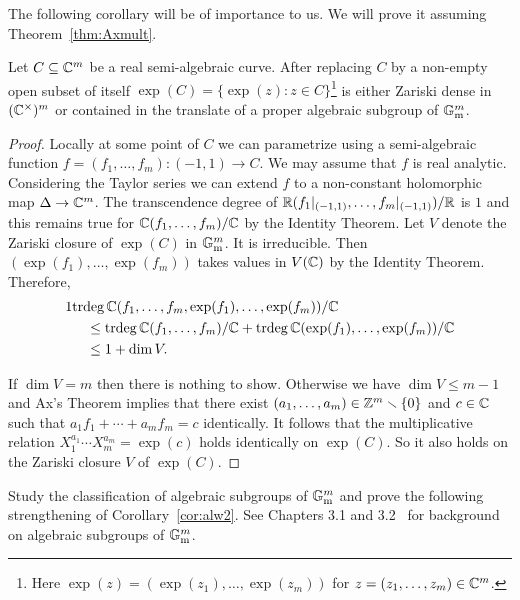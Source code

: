 The following corollary will be of importance to us. We will prove it
assuming Theorem~\ref{thm:Axmult}. 

\begin{corollary}
  \label{cor:alw}
  Let $C\subseteq{\mathbb{C}}^m$ be a real semi-algebraic curve.
  After replacing $C$ by a non-empty open subset of itself
 $\exp(C)=\{\exp(z) :z\in
  C\}$\footnote{Here $\exp(z) = (\exp(z_1),\ldots,\exp(z_m))$ for
    $z=(z_1,\ldots,z_m)\in{\mathbb{C}}^m$.} is either Zariski dense in
  $({\mathbb{C}}^\times)^m$ or contained in
  the
  translate of a proper algebraic subgroup of ${\mathbb{G}}_{\mathrm{m}}^m$.   
\end{corollary}
\begin{proof}  
  Locally at some point of $C$ we can parametrize using a
  semi-algebraic function $f=(f_1,\ldots,f_m)\colon (-1,1)\rightarrow C$. We may assume
  that $f$ is real
  analytic. Considering the Taylor series we can extend $f$ to a
  non-constant  holomorphic map $\Delta\rightarrow{\mathbb{C}}^m$. The
  transcendence degree of
  ${\mathbb{R}}({f_1}|_{(-1,1)},\ldots,{f_m}|_{(-1,1)})/{\mathbb{R}}$ is $1$ and this
  remains true for ${\mathbb{C}}(f_1,\ldots,f_m)/{\mathbb{C}}$ by the Identity Theorem.
  Let $V$ denote the Zariski closure of $\exp(C)$ in
  ${\mathbb{G}}_{\mathrm{m}}^m$. It is irreducible. 
  Then $(\exp(f_1),\ldots,\exp(f_m))$ takes values in $V({\mathbb{C}})$ by
  the Identity Theorem.
  Therefore,
  \begin{alignat*}1
    &\mathrm{trdeg}\,\IC(f_1,\ldots,f_m,\exp(f_1),\ldots,\exp(f_m))/\IC
    \\
    &\quad \le
    \mathrm{trdeg}\,\IC(f_1,\ldots,f_m)/\IC+\mathrm{trdeg}\,\IC(\exp(f_1),\ldots,\exp(f_m))/\IC\\
    &\quad \le
    1+\dim V.
  \end{alignat*}

  If $\dim V=m$ then there is nothing to show. Otherwise we have $\dim
  V \le m-1$ and 
  Ax's Theorem implies that there exist
  $(a_1,\ldots,a_m)\in{\mathbb{Z}}^m\smallsetminus\{0\}$ and $c\in{\mathbb{C}}$ such that
  $a_1f_1+\cdots+a_mf_m=c$ identically. It follows that the
  multiplicative relation
  $X_1^{a_1}\cdots X_m^{a_m} = \exp(c)$ holds identically on
  $\exp(C)$. So it also holds on the Zariski closure $V$ of $\exp(C)$. 
\end{proof}

\begin{exercise}
  Study the classification of algebraic subgroups of ${\mathbb{G}}_{\mathrm{m}}^m$
  and prove the following strengthening of Corollary~\ref{cor:alw2}.
  See Chapters 3.1 and 3.2~\cite{BG} for background on algebraic
  subgroups of ${\mathbb{G}}_{\mathrm{m}}^m$. 
\end{exercise}


